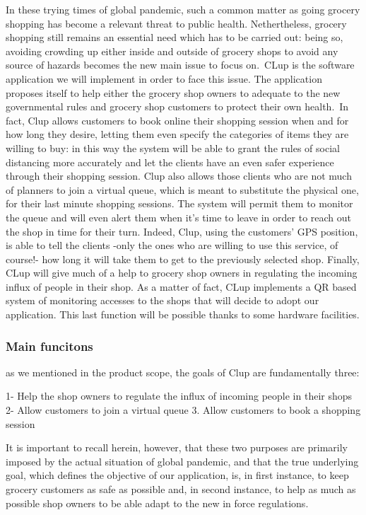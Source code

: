 In these trying times of global pandemic, such a common matter as going grocery shopping has become a relevant threat to public health. 
Nethertheless, grocery shopping still remains an essential need which has to be carried out: being so, avoiding crowding up either inside and outside of grocery shops to avoid any source of hazards becomes the new main issue to focus on.\ 
CLup is the software application we will implement in order to face this issue.
The application proposes itself to help either the grocery shop owners to adequate to the new governmental rules and grocery shop customers to protect their own health.\ 
In fact, Clup allows customers to book online their shopping session when and for how long they desire, letting them even specify the categories of items they are willing to buy: in this way the system will be able to grant the rules of social distancing more accurately and let the clients have an even safer experience through their shopping session.
Clup also allows those clients who are not much of planners to join a virtual queue, which is meant to substitute the physical one, for their last minute shopping sessions. The system will permit them to monitor the queue and will even alert them when it’s time to leave in order to reach out the shop in time for their turn. 
Indeed, Clup, using the customers’ GPS position, is able to tell the clients -only the ones who are willing to use this service, of course!- how long it will take them to get to the previously selected shop.
Finally, CLup will give much of a help to grocery shop owners in regulating the incoming influx of people in their shop. As a matter of fact, CLup implements a QR based system of monitoring accesses to the shops that will decide to adopt our application. This last function will be possible thanks to some hardware facilities.

\subsubsection{Main funcitons}
\label{subsect:mainfunctions}

as we mentioned in the product scope, the goals of Clup are fundamentally three: 

1- Help the shop owners to regulate the influx of incoming people in their shops
2- Allow customers to join a virtual queue
3. Allow customers to book a shopping session

It is important to recall herein, however, that these two purposes are primarily imposed by the actual situation of global pandemic, and that the true underlying goal, which defines the objective of our application, is, in first instance, to keep grocery customers as safe as possible and, in second instance, to help as much as possible shop owners to be able adapt to the new in force regulations.

